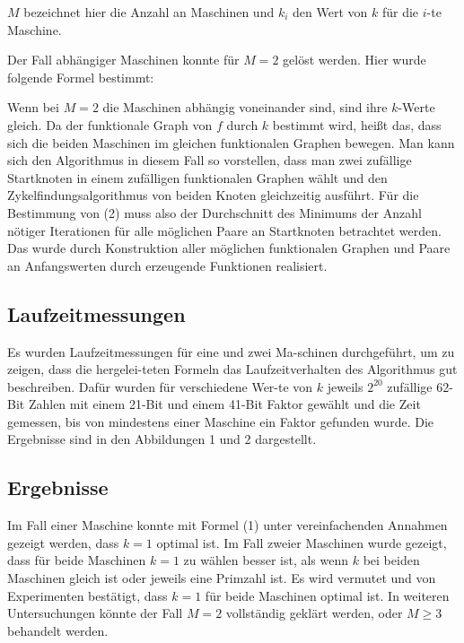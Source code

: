 \documentclass[a4paper, extrafontsizes, ngerman, 25pt]{memoir}
\begin{document}
\noindent $M$ bezeichnet hier die Anzahl an Maschinen und $k_i$ den Wert von $k$ für die $i$-te Maschine.

Der Fall abhängiger Maschinen konnte für $M = 2$ gelöst werden. Hier wurde folgende Formel bestimmt:

\begin{figure}[H]
    \hspace{2.8cm}
    
\end{figure}

\noindent Wenn bei $M = 2$ die Maschinen abhängig voneinander sind, sind ihre $k$-Werte gleich. Da der funktionale Graph von $f$ durch $k$ bestimmt wird, heißt das, dass sich die beiden Maschinen im gleichen funktionalen Graphen bewegen. Man kann sich den Algorithmus in diesem Fall so vorstellen, dass man zwei zufällige Startknoten in einem zufälligen funktionalen Graphen wählt und den Zykelfindungsalgorithmus von beiden Knoten gleichzeitig ausführt. Für die Bestimmung von (2) muss also der Durchschnitt des Minimums der Anzahl nötiger Iterationen für alle möglichen Paare an Startknoten betrachtet werden. Das wurde durch Konstruktion aller möglichen funktionalen Graphen und Paare an Anfangswerten durch erzeugende Funktionen realisiert.

\newpage

\subsection{Laufzeitmessungen} Es wurden Laufzeitmessungen für eine und zwei Ma-schinen durchgeführt, um zu zeigen, dass die hergelei-teten Formeln das Laufzeitverhalten des Algorithmus gut beschreiben. Dafür wurden für verschiedene Wer-te von $k$ jeweils $2^{20}$ zufällige 62-Bit Zahlen mit einem 21-Bit und einem 41-Bit Faktor gewählt und die Zeit gemessen, bis von mindestens einer Maschine ein Faktor gefunden wurde. Die Ergebnisse sind in den Abbildungen 1 und 2 dargestellt.

\vspace{2.3cm}
\subsection{Ergebnisse}

Im Fall einer Maschine konnte mit Formel (1) unter vereinfachenden Annahmen gezeigt werden, dass $k = 1$ optimal ist. Im Fall zweier Maschinen wurde gezeigt, dass für beide Maschinen $k = 1$ zu wählen besser ist, als wenn $k$ bei beiden Maschinen gleich ist oder jeweils eine Primzahl ist. Es wird vermutet und von Experimenten bestätigt, dass $k = 1$ für beide Maschinen optimal ist. In weiteren Untersuchungen könnte der Fall $M = 2$ vollständig geklärt werden, oder $M \ge 3$ behandelt werden.
\end{document}
